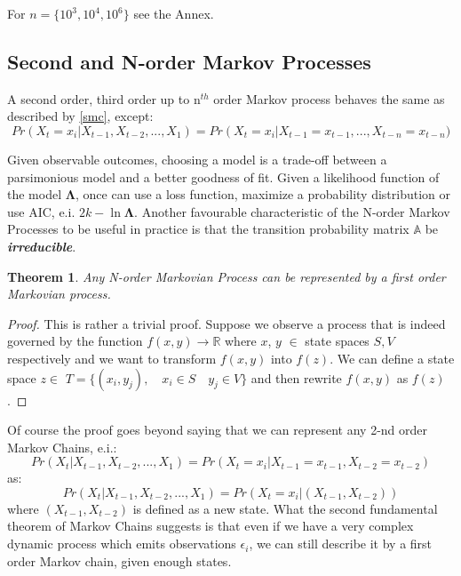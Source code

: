 \documentclass[a4paper,12pt]{article}
\newtheorem{theorem}{Theorem}[section]
\theoremstyle{definition}
\begin{document}
For $n = \{10^3, 10^4, 10^6\}$ see the Annex. 



\subsection{Second and N-order Markov Processes}
A second order, third order up to $\text{n}^{th}$ order Markov process behaves the same as described by \ref{smc}, except:
\begin{equation*}
Pr\left(X_t = x_i |X_{t-1},X_{t-2},...,X_{1}  \right) = Pr\left( X_t=x_i \right|X_{t-1}=x_{t-1},...,X_{t-n}=x_{t-n})
\end{equation*}

Given observable outcomes, choosing a model is a trade-off between a parsimonious model and a better goodness of fit. Given a likelihood function of the model $\mathbf{\Lambda}$, once can use a loss function, maximize a probability distribution or use AIC, e.i. $2k-\ln{\mathbf{\Lambda}}$. Another favourable characteristic of the N-order Markov Processes to be useful in practice is that the transition probability matrix $\mathbb{A}$ be \textbf{\textit{irreducible}}.

\begin{theorem}
Any N-order Markovian Process can be represented by a first order Markovian process. 
\end{theorem}
\begin{proof}
This is rather a trivial proof. Suppose we observe a process that is indeed governed by the function $f(x,y) \to \mathbb{R}$ where $x$, $y$ $\in$  state spaces $S,V$ respectively and we want to transform $f(x,y)$ into $f(z)$. We can define a state space $z \in$ $T = \{(x_i,y_j), \quad x_i \in S \quad y_j \in V  \}$ and then rewrite $f(x,y)$ as $f(z)$. 
\end{proof}
Of course the proof goes beyond saying that we can represent any 2-nd order Markov Chains, e.i.:
\begin{equation*}
Pr\left(X_t |X_{t-1},X_{t-2},...,X_{1}  \right) = Pr\left( X_t=x_i |X_{t-1}=x_{t-1},X_{t-2}=x_{t-2} \right)
\end{equation*}
as:
\begin{equation*}
Pr\left(X_t |X_{t-1},X_{t-2},...,X_{1}  \right) = Pr\left( X_t=x_i |(X_{t-1},X_{t-2}) \right)
\end{equation*}
where $(X_{t-1},X_{t-2})$ is defined as a new state. 
What the second fundamental theorem of Markov Chains suggests is that even if we have a very complex dynamic process which emits observations $\epsilon_i$, we can still describe it by a first order Markov chain, given enough states. 
\end{document}
